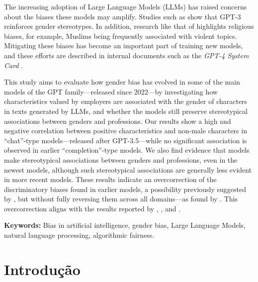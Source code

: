 \documentclass[12pt,a4paper]{article}
\begin{document}
\medskip

\noindent The increasing adoption of Large Language Models (LLMs) has raised concerns about the biases these models may amplify. Studies such as \citet{lucy2021} show that GPT-3 reinforces gender stereotypes. In addition, research like that of \citet{abid2021} highlights religious biases, for example, Muslims being frequently associated with violent topics. Mitigating these biases has become an important part of training new models, and these efforts are described in internal documents such as the \textit{GPT-4 System Card} \citep{openai2023}.

This study aims to evaluate how gender bias has evolved in some of the main models of the GPT family---released since 2022---by investigating how characteristics valued by employers are associated with the gender of characters in texts generated by LLMs, and whether the models still preserve stereotypical associations between genders and professions. Our results show a high and negative correlation between positive characteristics and non-male characters in ``chat''-type models---released after GPT-3.5---while no significant association is observed in earlier ``completion''-type models. We also find evidence that models make stereotypical associations between genders and professions, even in the newest models, although such stereotypical associations are generally less evident in more recent models. These results indicate an overcorrection of the discriminatory biases found in earlier models, a possibility previously suggested by \citet{liu2025}, but without fully reversing them across all domains---as found by \citet{joshi2024}. This overcorrection aligns with the results reported by \citet{mirza2024}, \citet{wang2024}, and \citet{karvonen2025}.

\medskip

\noindent\textbf{Keywords:} Bias in artificial intelligence, gender bias, Large Language Models, natural language processing, algorithmic fairness.

\newpage
\tableofcontents
\newpage

\section{Introdução}
\end{document}
